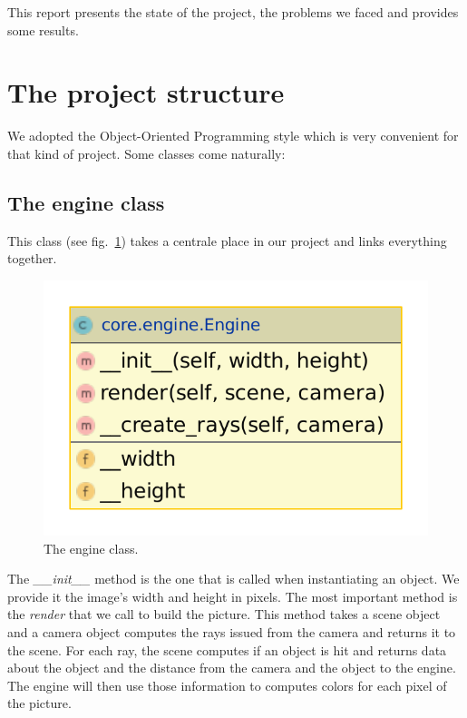 \documentclass[a4paper,11pt]{article}%
\begin{document}
This report presents the state of the project, the problems we faced and provides some results.

\section{The project structure}
We adopted the Object-Oriented Programming style which is very convenient for that kind of project. Some classes come naturally:
\subsection*{The engine class}
This class (see fig.~\ref{fig:engine}) takes a centrale place in our project and links everything together.
\begin{figure}[h]
    \centering
    \includegraphics[scale=0.3]{img/engine.pdf}
    \caption{The engine class.}
    \label{fig:engine}
\end{figure}

The \emph{\_\_init\_\_} method is the one that is called when instantiating an object. We provide it the image's width and height in pixels.
The most important method is the \emph{render} that we call to build the picture. This method takes a scene object and a camera object computes the rays issued from the camera and returns it to the scene. For each ray, the scene computes if an object is hit and returns data about the object and the distance from the camera and the object to the engine.
The engine will then use those information to computes colors for each pixel of the picture.
\end{document}
